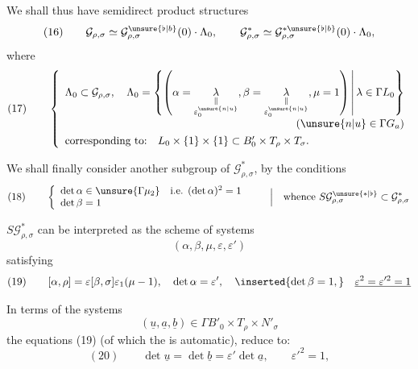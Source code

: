 
We shall thus have semidirect product structures
\[
(16)\qquad
\mathcal G_{\rho,\sigma}\simeq
\mathcal G_{\rho,\sigma}^{\unsure{\flat|b}}(0)\cdot\Lambda_0,
\qquad
\mathcal G_{\rho,\sigma}^{*}\simeq
\mathcal G_{\rho,\sigma}^{*\unsure{\flat|b}}(0)\cdot\Lambda_0,
\]
where
\[
(17)\qquad
\left\{\begin{array}{l}
\displaystyle\Lambda_0\subset\mathcal G_{\rho,\sigma},\quad
\Lambda_0=\left\{\left(
\alpha=\underset{\substack{\Vert\\\varepsilon_0^{\unsure{n|u}}}}{\lambda},
\beta=\underset{\substack{\Vert\\\varepsilon_0^{\unsure{n|u}}}}{\lambda},
\mu=1\right)\,\middle|\,\lambda\in\Gamma L_0\right\}\\
\hfill(\unsure{n|u}\in\Gamma\mathbb \mathbb G_a)\\[4pt]
\text{corresponding to:}\quad L_0\times\{1\}\times\{1\}
\subset B'_0\times T_\rho\times T_\sigma.
\end{array}\right.
\]

We shall finally consider another subgroup  of
$\mathcal G_{\rho,\sigma}^{*}$, by the conditions
\[
(18)\qquad
\left\{\begin{array}{l}
\det\alpha\in\unsure{\Gamma\mu_2}\quad\text{i.e. }(\det\alpha)^2=1\\
\det\beta=1
\end{array}\right.
\qquad\left|\quad\text{whence }S\mathcal G_{\rho,\sigma}^{\unsure{*|\flat}}
\subset\mathcal G_{\rho,\sigma}^{*}\right.
\]

 
$S\mathcal G_{\rho,\sigma}^{*}$ can be interpreted as the scheme of systems
\[
(\alpha,\beta,\mu,\varepsilon,\varepsilon')
\]
satisfying
\[
(19)\qquad [\alpha,\rho]=\varepsilon[\beta,\sigma]\varepsilon_1(\mu-1),
\quad\det\alpha=\varepsilon',\quad
\inserted{\det\beta=1,}\quad
\underline{\varepsilon^2=\varepsilon'^2=1}
\]

In terms of the systems
\[
(\underline u,\underline a,\underline b)\in\Gamma B'_0\times T_\rho\times N'_\sigma
\]
the equations (19) (of which the  is automatic), reduce to:
\[
(20)\qquad\det\underline u=\det\underline b=\varepsilon'\det\underline a,
\qquad\varepsilon'^2=1,
\]


